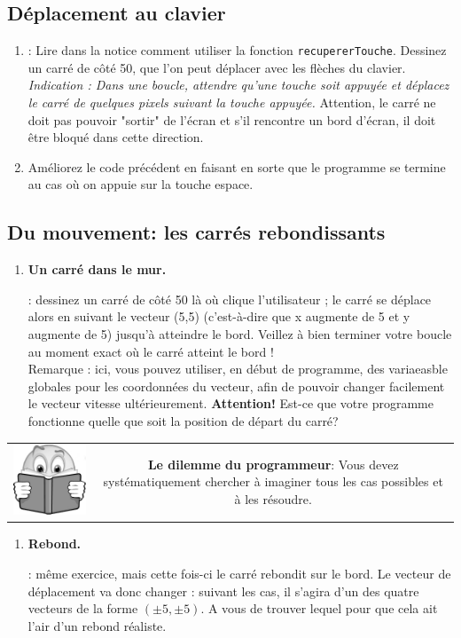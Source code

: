 \documentclass[11pt,a4paper]{article}
\newcommand{\checkbox}{$\square$ \smallskip}
\newenvironment{lecture}{%
\smallskip
\begin{tabular}{c|c}
    \hspace{.03\textwidth} \includegraphics[width=.07\textwidth]{img/lecture.jpg} & 
\begin{minipage}{.85\textwidth}
}{%
\end{minipage}
\end{tabular}
}
\newcounter{exo} \setcounter{exo}{0}
\newenvironment{action}{%
    \begin{enumerate}[\numerotation] \addtocounter{exo}{-1}%
        }{%
    \end{enumerate}
}
\newcommand{\numexoa}{\theexo \addtocounter{exo}{1}}
\newcommand{\numerotation}{\checkbox \smallskip \numexoa.}
\newcounter{exoo} \setcounter{exoo}{0}
\newcommand{\numexo}{\theexoo}
\newcommand{\repexo}{{\tt exo_\numexo}}
\newcommand{\exoplus}{\addtocounter{exoo}{1}}
\begin{document}
\subsection*{Déplacement au clavier}
\begin{action}
\item \exoplus \repexo : Lire dans la notice comment utiliser la fonction {\tt recupererTouche}. Dessinez un carré de côté 50, que l'on peut déplacer avec les flèches du clavier. \emph{Indication : Dans une boucle, attendre qu'une touche soit appuyée et déplacez le carré de quelques pixels suivant la touche appuyée.} Attention, le carré ne doit pas pouvoir "sortir" de l'écran et s'il rencontre un bord d'écran, il doit être bloqué dans cette direction.
\item Améliorez le code précédent en faisant en sorte que le programme se termine au cas où on appuie sur la touche espace.
\end{action}

\newpage
\subsection*{Du mouvement: les carrés rebondissants}
\begin{action}
\item {\bf Un carré dans le mur.} \exoplus \repexo : dessinez un carré de côté 50 là où clique l'utilisateur ; le carré se déplace alors en suivant le vecteur (5,5) (c'est-à-dire que x augmente de 5 et y augmente de 5) jusqu'à atteindre le bord. Veillez à bien terminer votre boucle au moment exact où le carré atteint le bord ! \\
Remarque : ici, vous pouvez utiliser, en début de programme, des variaeasble globales pour les coordonnées du vecteur, afin de pouvoir changer facilement le vecteur vitesse ultérieurement.
{\bf Attention!} Est-ce que votre programme fonctionne quelle que soit la position de départ du carré?
\end{action}

\begin{lecture}
{\bf Le dilemme du programmeur}: \og {\it monteriez-vous dans un avion piloté par un programme que vous avez écrit?} \fg  Vous devez systématiquement chercher à imaginer tous les cas possibles et à les résoudre.
\end{lecture}

\begin{action}
\item {\bf Rebond.} \exoplus \repexo : même exercice, mais cette fois-ci le carré rebondit sur le bord. Le vecteur de déplacement va donc changer : suivant les cas, il s'agira d'un des quatre vecteurs de la forme $(\pm5,\pm5)$. A vous de trouver lequel pour que cela ait l'air d'un rebond réaliste.
\end{action}
\end{document}
